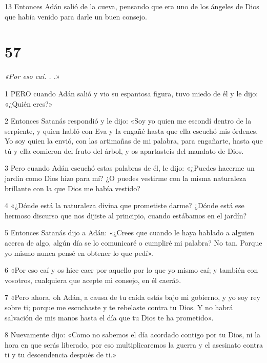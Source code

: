 \par 13 Entonces Adán salió de la cueva, pensando que era uno de los ángeles de Dios que había venido para darle un buen consejo.

\chapter{57}

\par \textit{«Por eso caí. . .}»

\par 1 PERO cuando Adán salió y vio su espantosa figura, tuvo miedo de él y le dijo: «¿Quién eres?»

\par 2 Entonces Satanás respondió y le dijo: «Soy yo quien me escondí dentro de la serpiente, y quien habló con Eva y la engañé hasta que ella escuchó mis órdenes. Yo soy quien la envió, con las artimañas de mi palabra, para engañarte, hasta que tú y ella comieron del fruto del árbol, y os apartasteis del mandato de Dios.

\par 3 Pero cuando Adán escuchó estas palabras de él, le dijo: «¿Puedes hacerme un jardín como Dios hizo para mí? ¿O puedes vestirme con la misma naturaleza brillante con la que Dios me había vestido?

\par 4 «¿Dónde está la naturaleza divina que prometiste darme? ¿Dónde está ese hermoso discurso que nos dijiste al principio, cuando estábamos en el jardín?

\par 5 Entonces Satanás dijo a Adán: «¿Crees que cuando le haya hablado a alguien acerca de algo, algún día se lo comunicaré o cumpliré mi palabra? No tan. Porque yo mismo nunca pensé en obtener lo que pedí».

\par 6 «Por eso caí y os hice caer por aquello por lo que yo mismo caí; y también con vosotros, cualquiera que acepte mi consejo, en él caerá».

\par 7 «Pero ahora, oh Adán, a causa de tu caída estás bajo mi gobierno, y yo soy rey ​​sobre ti; porque me escuchaste y te rebelaste contra tu Dios. Y no habrá salvación de mis manos hasta el día que tu Dios te ha prometido».

\par 8 Nuevamente dijo: «Como no sabemos el día acordado contigo por tu Dios, ni la hora en que serás liberado, por eso multiplicaremos la guerra y el asesinato contra ti y tu descendencia después de ti.»

